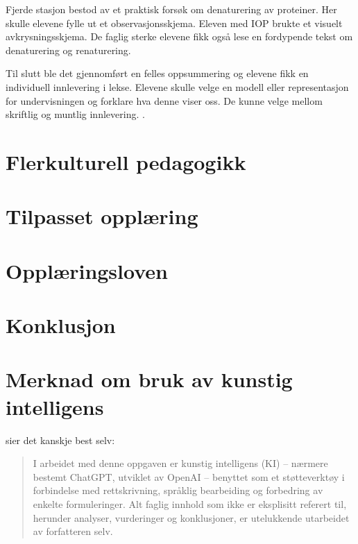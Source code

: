 \documentclass[a4paper,12pt]{article}
\begin{document}
Fjerde stasjon bestod av et praktisk forsøk om denaturering av proteiner. Her skulle elevene fylle ut et observasjonsskjema.  Eleven med IOP brukte et visuelt avkrysningsskjema. De faglig sterke elevene fikk også lese en fordypende tekst om denaturering og renaturering.

Til slutt ble det gjennomført en felles oppsummering og elevene fikk en individuell innlevering i lekse. Elevene skulle velge en modell eller representasjon for undervisningen og forklare hva denne viser oss. De kunne velge mellom skriftlig og muntlig innlevering. \parencite[§5]{opplaeringsloven}.

\section{Flerkulturell pedagogikk}
\cite{iversen2025}
\section{Tilpasset opplæring}
\cite{holland2021}
\section{Opplæringsloven}

\section{Konklusjon}

\section*{Merknad om bruk av kunstig intelligens}

\textcite{openai_chatgpt} sier det kanskje best selv: 
\begin{quote}
I arbeidet med denne oppgaven er kunstig intelligens (KI) -- nærmere bestemt ChatGPT, utviklet av OpenAI -- benyttet som et støtteverktøy i forbindelse med rettskrivning, språklig bearbeiding og forbedring av enkelte formuleringer. Alt faglig innhold som ikke er eksplisitt referert til, herunder analyser, vurderinger og konklusjoner, er utelukkende utarbeidet av forfatteren selv.
\end{quote}

%
\printbibliography[title={Litteraturliste}]
\end{document}
